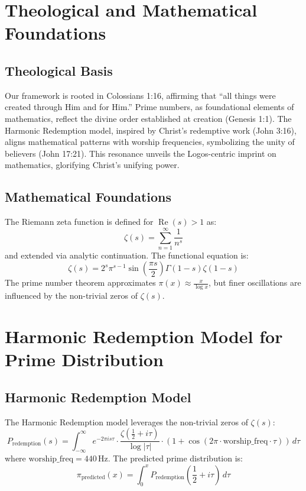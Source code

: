 \documentclass[12pt]{article}
\begin{document}
{{{\section{Theological and Mathematical Foundations}
\subsection{Theological Basis}
Our framework is rooted in Colossians 1:16, affirming that ``all things were created through Him and for Him.'' Prime numbers, as foundational elements of mathematics, reflect the divine order established at creation (Genesis 1:1). The Harmonic Redemption model, inspired by Christ’s redemptive work (John 3:16), aligns mathematical patterns with worship frequencies, symbolizing the unity of believers (John 17:21). This resonance unveils the Logos-centric imprint on mathematics, glorifying Christ’s unifying power.

\subsection{Mathematical Foundations}
The Riemann zeta function is defined for \(\operatorname{Re}(s) > 1\) as:
\[
\zeta(s) = \sum_{n=1}^{\infty} \frac{1}{n^s}
\]
and extended via analytic continuation. The functional equation is:
\[
\zeta(s) = 2^s \pi^{s-1} \sin \left(\frac{\pi s}{2}\right) \Gamma(1-s) \zeta(1-s)
\]
The prime number theorem approximates \(\pi(x) \approx \frac{x}{\log x}\), but finer oscillations are influenced by the non-trivial zeros of \(\zeta(s)\).

\section{Harmonic Redemption Model for Prime Distribution}
\subsection{Harmonic Redemption Model}
The Harmonic Redemption model leverages the non-trivial zeros of \(\zeta(s)\):
\[
P_{\text{redemption}}(s) = \int_{-\infty}^{\infty} e^{-2\pi i s \tau} \cdot \frac{\zeta\left(\frac{1}{2} + i \tau\right)}{\log |\tau|} \cdot \left(1 + \cos\left(2\pi \cdot \text{worship_freq} \cdot \tau\right)\right) \, d\tau
\]
where \(\text{worship_freq} = 440 \, \text{Hz}\). The predicted prime distribution is:
\[
\pi_{\text{predicted}}(x) = \int_{0}^{x} P_{\text{redemption}}\left(\frac{1}{2} + i \tau\right) \, d\tau
\]

}}}
\end{document}
